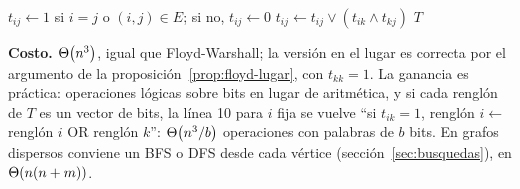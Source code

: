 \documentclass[11pt,letterpaper]{article}
\begin{document}
\begin{algorithm}[H]
\caption{\textsc{Cerradura-Transitiva}$(G)$, en el lugar}
\label{alg:cerradura-transitiva}
\begin{algorithmic}[1]
      \State $t_{ij} \gets 1$ si $i = j$ o $(i, j) \in E$; si no,
             $t_{ij} \gets 0$
    \EndFor
  \EndFor
        \State $t_{ij} \gets t_{ij} \lor (t_{ik} \land t_{kj})$
      \EndFor
    \EndFor
  \EndFor
  \State \Return $T$
\EndProcedure
\end{algorithmic}
\end{algorithm}

\textbf{Costo.} $\Theta\!\left(n^3\right)$, igual que Floyd-Warshall; la versión en
el lugar es correcta por el argumento de la
proposición~\ref{prop:floyd-lugar}, con $t_{kk} = 1$. La ganancia es
práctica: operaciones lógicas sobre bits en lugar de aritmética, y si
cada renglón de $T$ es un vector de bits, la línea 10 para $i$ fija se
vuelve ``si $t_{ik} = 1$, renglón $i \gets$ renglón $i$ OR renglón
$k$'': $\Theta\!\left(n^3 / b\right)$ operaciones con palabras de $b$ bits. En grafos
dispersos conviene un BFS o DFS desde cada vértice
(sección~\ref{sec:busquedas}), en $\Theta\!\left(n(n + m)\right)$.
\end{document}
